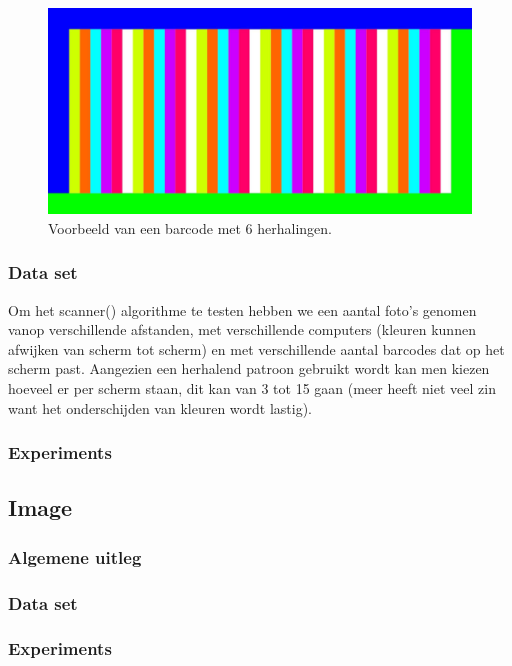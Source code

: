 \documentclass[a4paper,11pt]{article}
\begin{document}
\begin{figure}
\centering
\includegraphics[scale=0.1]{barcode}
\caption{Voorbeeld van een barcode met 6 herhalingen.} 
\label{fig:barcode}
\end{figure}



\subsubsection{Data set}

Om het scanner() algorithme te testen hebben we een aantal foto's genomen vanop verschillende afstanden, met verschillende computers (kleuren kunnen afwijken van scherm tot scherm) en met verschillende aantal barcodes dat op het scherm past. Aangezien een herhalend patroon gebruikt wordt kan men kiezen hoeveel er per scherm staan, dit kan van 3 tot 15 gaan (meer heeft niet veel zin want het onderschijden van kleuren wordt lastig).

\subsubsection{Experiments}\label{sec:experimenten}

\subsection{Image}
\subsubsection{Algemene uitleg}
\subsubsection{Data set}
\subsubsection{Experiments}
\end{document}
